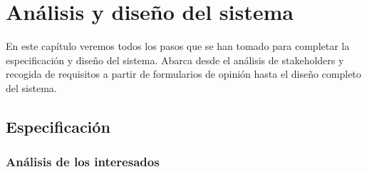 \chapter{Análisis y diseño del sistema}
\label{ch:analysis}

En este capítulo veremos todos los pasos que se han tomado para completar la especificación y diseño del sistema. Abarca desde el análisis de stakeholders y recogida de requisitos a partir de formularios de opinión hasta el diseño completo del sistema.

\section{Especificación}

\subsection{Análisis de los interesados}

